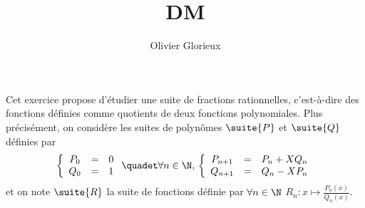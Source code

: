 \documentclass[a4paper, 11pt,reqno]{article}
\author{Olivier Glorieux}
\begin{document}
\title{DM }















\begin{exercice}
Cet exercice propose d'étudier une suite de fractions rationnelles, c'est-à-dire des fonctions définies comme quotients de deux fonctions polynomiales. Plus précisément, on considère les suites de polynômes $\suite{P}$ et $\suite{Q}$ définies par 
$$
\left\{\begin{array}{ccc}
P_0 &=& 0\\
Q_0 &=& 1
\end{array}
 \right. \quadet \forall n\in \N, \, 
\left\{\begin{array}{ccc}
P_{n+1} &=& P_n + X Q_n\\
Q_{n+1} &=& Q_n -XP_n
\end{array}
 \right. 
$$
et on note $\suite{R}$ la suite de fonctions définie par $\forall n\in \N$ 
$R_n : x\mapsto\frac{P_n(x)}{Q_n(x)}.$


\end{exercice}
\end{document}
